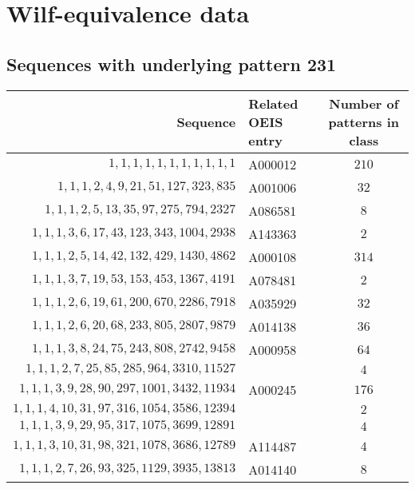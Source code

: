 \chapter{Wilf-equivalence data}
\section{Sequences with underlying pattern 231}
\begin{longtabu}{|r|l|c|}
    \hline
    Sequence & Related OEIS entry & Number of patterns in class\\
    \hline
    \endfirsthead
    \hline
    \endhead
    \hline
    \endfoot
    \(1,    1,    1,    1,    1,    1,    1,    1,    1,    1,     1\)  & A000012 &\(210\)\\
    \(1,    1,    1,    2,    4,    9,   21,   51,  127,  323,   835\)  & A001006 &\(32\)\\
    \(1,    1,    1,    2,    5,   13,   35,   97,  275,  794,  2327\)  & A086581 &\(8\)\\
    \(1,    1,    1,    3,    6,   17,   43,  123,  343, 1004,  2938\)  & A143363 &\(2\)\\
    \(1,    1,    1,    2,    5,   14,   42,  132,  429, 1430,  4862\)  & A000108 &\(314\)\\
    \(1,    1,    1,    3,    7,   19,   53,  153,  453, 1367,  4191\)  & A078481 &\(2\)\\
    \(1,    1,    1,    2,    6,   19,   61,  200,  670, 2286,  7918\)  & A035929 &\(32\)\\
    \(1,    1,    1,    2,    6,   20,   68,  233,  805, 2807,  9879\)  & A014138 &\(36\)\\
    \(1,    1,    1,    3,    8,   24,   75,  243,  808, 2742,  9458\)  & A000958 &\(64\)\\
    \(1,    1,    1,    2,    7,   25,   85,  285,  964, 3310, 11527\)  &  &\(4\)\\
    \(1,    1,    1,    3,    9,   28,   90,  297, 1001, 3432, 11934\)  & A000245 &\(176\)\\
    \(1,    1,    1,    4,   10,   31,   97,  316, 1054, 3586, 12394\)  &  &\(2\)\\
    \(1,    1,    1,    3,    9,   29,   95,  317, 1075, 3699, 12891\)  &  &\(4\)\\
    \(1,    1,    1,    3,   10,   31,   98,  321, 1078, 3686, 12789\)  & A114487 &\(4\)\\
    \(1,    1,    1,    2,    7,   26,   93,  325, 1129, 3935, 13813\)  & A014140 &\(8\)\\

\end{longtabu}
